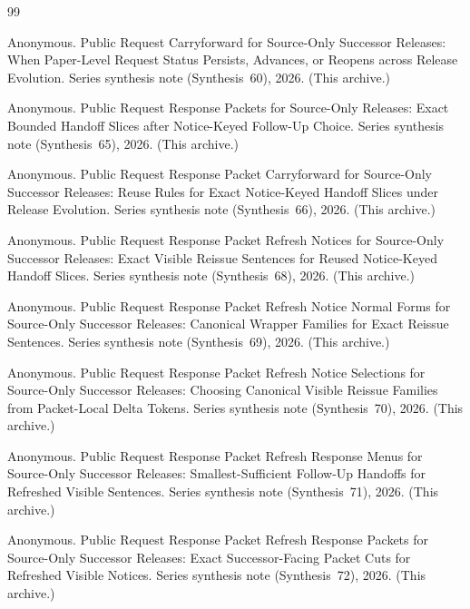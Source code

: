 \documentclass[11pt]{article}
\begin{document}
\begin{thebibliography}{99}\small

Anonymous.
\newblock Public Request Carryforward for Source-Only Successor Releases: When Paper-Level Request Status Persists, Advances, or Reopens across Release Evolution.
\newblock Series synthesis note (Synthesis~60), 2026. (This archive.)

Anonymous.
\newblock Public Request Response Packets for Source-Only Releases: Exact Bounded Handoff Slices after Notice-Keyed Follow-Up Choice.
\newblock Series synthesis note (Synthesis~65), 2026. (This archive.)

Anonymous.
\newblock Public Request Response Packet Carryforward for Source-Only Successor Releases: Reuse Rules for Exact Notice-Keyed Handoff Slices under Release Evolution.
\newblock Series synthesis note (Synthesis~66), 2026. (This archive.)

Anonymous.
\newblock Public Request Response Packet Refresh Notices for Source-Only Successor Releases: Exact Visible Reissue Sentences for Reused Notice-Keyed Handoff Slices.
\newblock Series synthesis note (Synthesis~68), 2026. (This archive.)

Anonymous.
\newblock Public Request Response Packet Refresh Notice Normal Forms for Source-Only Successor Releases: Canonical Wrapper Families for Exact Reissue Sentences.
\newblock Series synthesis note (Synthesis~69), 2026. (This archive.)

Anonymous.
\newblock Public Request Response Packet Refresh Notice Selections for Source-Only Successor Releases: Choosing Canonical Visible Reissue Families from Packet-Local Delta Tokens.
\newblock Series synthesis note (Synthesis~70), 2026. (This archive.)

Anonymous.
\newblock Public Request Response Packet Refresh Response Menus for Source-Only Successor Releases: Smallest-Sufficient Follow-Up Handoffs for Refreshed Visible Sentences.
\newblock Series synthesis note (Synthesis~71), 2026. (This archive.)

Anonymous.
\newblock Public Request Response Packet Refresh Response Packets for Source-Only Successor Releases: Exact Successor-Facing Packet Cuts for Refreshed Visible Notices.
\newblock Series synthesis note (Synthesis~72), 2026. (This archive.)


\end{thebibliography}
\end{document}
